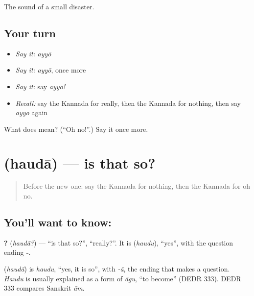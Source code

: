 \begin{grammarlens}[title={What you've built}]
The sound of a small disaster.
\end{grammarlens}

\subsection*{Your turn}
\begin{itemize}
\raggedright
  \item \emph{Say it:} \emph{ayyō}
  \item \emph{Say it:} \emph{ayyō}, once more
  \item \emph{Say it:} say \emph{ayyō!}
  \item \emph{Recall:} say the Kannada for really, then the Kannada for nothing, then say \emph{ayyō} again
\end{itemize}

\begin{tcolorbox}[breakable,colback=teal!4,colframe=teal!35!black,title={Before you move on}]
What does  mean? (\textquotedblleft{}Oh no!\textquotedblright{}.) Say it once more.
\end{tcolorbox}
\section[\texorpdfstring{\kn{ಹೌದಾ} (haudā)}{ಹೌದಾ (haudā)}]{ (haudā) — is that so?}

\label{lesson:KA-C87-isthatso}



\begin{quote}
Before the new one: say the Kannada for nothing, then the Kannada for oh no.
\end{quote}

\subsection*{You'll want to know: }
\textbf{?} (\emph{haudā?}) — \textquotedblleft{}is that so?\textquotedblright{}, \textquotedblleft{}really?\textquotedblright{}. It is \textbf{} (\emph{haudu}), \textquotedblleft{}yes\textquotedblright{}, with the question ending \textbf{‑}.

\begin{cousinweb}
\textbf{} (\emph{haudā}) is \emph{haudu}, \textquotedblleft{}yes, it is so\textquotedblright{}, with \emph{-ā}, the ending that makes a question. \emph{Haudu} is usually explained as a form of \emph{āgu}, \textquotedblleft{}to become\textquotedblright{} (DEDR 333). DEDR 333 compares Sanskrit \emph{ām}.
\end{cousinweb}

